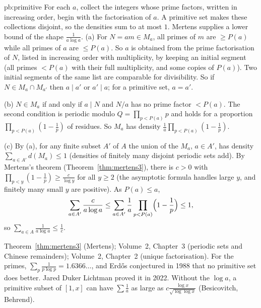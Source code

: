 \begin{solution}{pb:primitive}
\idea For each $a$, collect the integers whose prime factors, written in increasing order, begin with the factorisation of $a$. A primitive set makes these collections disjoint, so the densities sum to at most $1$. Mertens supplies a lower bound of the shape $\frac1{a\log a}$.
\writeup (a) For $N=am\in M_a$, all primes of $m$ are $\ge P(a)$ while all primes of $a$ are $\le P(a)$. So $a$ is obtained from the prime
factorisation of $N$, listed in increasing order with multiplicity, by keeping an initial segment (all primes $<P(a)$ with their full
multiplicity, and some copies of $P(a)$). Two initial segments of the same list are comparable for divisibility. So if $N\in M_a\cap M_{a'}$
then $a\mid a'$ or $a'\mid a$; for a primitive set, $a=a'$.

(b) $N\in M_a$ if and only if $a\mid N$ and $N/a$ has no prime factor $<P(a)$. The second condition is periodic modulo $Q=\prod_{p<P(a)}p$ and holds
for a proportion $\prod_{p<P(a)}(1-\frac1p)$ of residues. So $M_a$ has density $\frac1a\prod_{p<P(a)}(1-\frac1p)$.

(c) By (a), for any finite subset $A'$ of $A$ the union of the $M_a$, $a\in A'$, has density $\sum_{a\in A'}d(M_a)\le1$ (densities of finitely many
disjoint periodic sets add). By Mertens's theorem (Theorem~\ref{thm:mertens3}), there is $c>0$ with $\prod_{p<y}(1-\frac1p)\ge\frac c{\log y}$ for all $y\ge2$
(the asymptotic formula handles large $y$, and finitely many small $y$ are positive). As $P(a)\le a$,
\[
\sum_{a\in A'}\frac c{a\log a}\le\sum_{a\in A'}\frac1a\prod_{p<P(a)}\Bigl(1-\frac1p\Bigr)\le1,
\]
so $\sum_{a\in A}\frac1{a\log a}\le\frac1c$.

\tools Theorem~\ref{thm:mertens3} (Mertens); Volume~2, Chapter~3 (periodic sets and Chinese remainders); Volume~2, Chapter~2 (unique
factorisation).
\leads For the primes, $\sum_p\frac1{p\log p}=1.6366\ldots$, and Erdős conjectured in 1988 that no primitive set does better. Jared Duker
Lichtman proved it in 2022. Without the $\log a$, a primitive subset of $[1,x]$ can have $\sum\frac1a$ as large as $c\frac{\log x}{\sqrt{\log\log x}}$
(Besicovitch, Behrend).
\end{solution}

